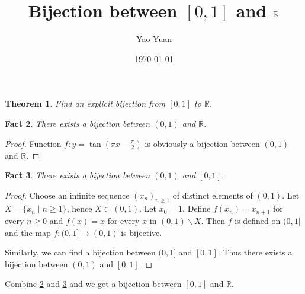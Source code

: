 \documentclass{article}
\title{Bijection between $[0, 1]$ and $\Real$}
\author{Yao Yuan}
\date{\today}
\newtheorem{theorem}{Theorem}
\newtheorem{fact}[theorem]{Fact}
\newcommand\Real{\mathbb{R}}
\begin{document}
\maketitle

\begin{tcolorbox}
    \begin{theorem} 
        Find an explicit bijection from $[0, 1]$ to $\Real$.
    \end{theorem} 
\end{tcolorbox}

\begin{fact}\label{fact:real}
    There exists a bijection between $(0, 1)$ and $\Real$.
\end{fact}

\begin{proof}
    Function $f: y = \tan(\pi x - \frac\pi2)$ is obviously a bijection between $(0, 1)$ and $\Real$.
\end{proof}

\begin{fact}\label{fact:extension}
    There exists a bijection between $(0, 1)$ and $[0, 1]$.
\end{fact}

\begin{proof}
    Choose an infinite sequence $(x_n)_{n \geq 1}$ of distinct elements of $(0,1)$. 
    Let $X=\{x_{n} \mid n \geq 1\}$, hence $X \subset (0,1) .$ Let $x_0=1 .$ Define $f(x_n) = x_{n+1} $ for every $n \geq 0$ and $ f(x) = x $ for every $ x $ in $(0,1) \backslash X$. Then $f$ is defined on $(0,1]$ and the map $f:(0,1] \rightarrow(0,1)$ is bijective.
    
    Similarly, we can find a bijection between $(0, 1]$ and $[0, 1]$. Thus there exists a bijection between $(0, 1)$ and $[0, 1]$.
\end{proof}

Combine \cref{fact:real} and \cref{fact:extension}
and we get a bijection between $[0, 1]$ and $\Real$.
\end{document}
